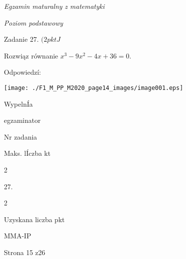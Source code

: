\documentclass[a4paper,12pt]{article}
\begin{document}
{\it Egzamin maturalny z matematyki}

{\it Poziom podstawowy}

Zadanie 27. $(2pktJ$

Rozwiąz równanie $x^{3}-9x^{2}-4x+36=0.$

Odpowiedzí:
\begin{center}
\texttt{[image: ./F1\_M\_PP\_M2020\_page14\_images/image001.eps]}
\end{center}
WypelnÍa

egzaminator

Nr zadania

Maks. lÍczba kt

2

27.

2

Uzyskana liczba pkt

MMA-IP

Strona 15 z26
\end{document}

